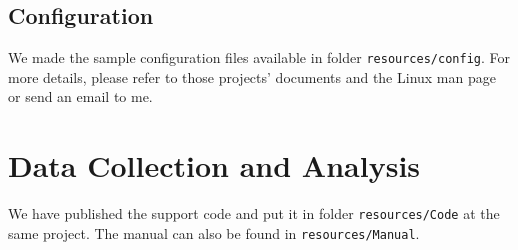\documentclass[conference]{IEEEtran}
\begin{document}
\subsection{Configuration}
We made the sample configuration files available in folder \texttt{resources/config}. For more details, please refer to those projects' documents and the Linux man page or send an email to me.

\appendix
\section{Data Collection and Analysis}
We have published the support code and put it in folder \texttt{resources/Code} at the same project. The manual can also be found in \texttt{resources/Manual}.
\end{document}
